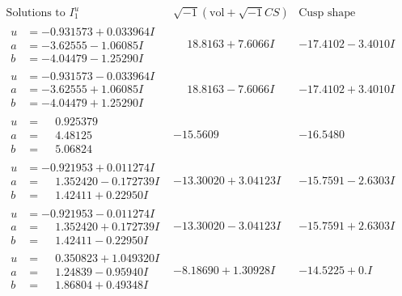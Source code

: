 \documentclass[1p]{elsarticle_modified}
\theoremstyle{definition}
\newcommand{\I}{\sqrt{-1}}
\begin{document}
$$\begin{array}{c|c|c}  
\text{Solutions to }I^u_{1}& \I (\text{vol} + \sqrt{-1}CS) & \text{Cusp shape}\\
 \hline 
\begin{aligned}
u &= -0.931573 + 0.033964 I \\
a &= -3.62555 - 1.06085 I \\
b &= -4.04479 - 1.25290 I\end{aligned}
 & \phantom{-}18.8163 + 7.6066 I & -17.4102 - 3.4010 I \\ \hline\begin{aligned}
u &= -0.931573 - 0.033964 I \\
a &= -3.62555 + 1.06085 I \\
b &= -4.04479 + 1.25290 I\end{aligned}
 & \phantom{-}18.8163 - 7.6066 I & -17.4102 + 3.4010 I \\ \hline\begin{aligned}
u &= \phantom{-}0.925379\phantom{ +0.000000I} \\
a &= \phantom{-}4.48125\phantom{ +0.000000I} \\
b &= \phantom{-}5.06824\phantom{ +0.000000I}\end{aligned}
 & -15.5609\phantom{ +0.000000I} & -16.5480\phantom{ +0.000000I} \\ \hline\begin{aligned}
u &= -0.921953 + 0.011274 I \\
a &= \phantom{-}1.352420 - 0.172739 I \\
b &= \phantom{-}1.42411 + 0.22950 I\end{aligned}
 & -13.30020 + 3.04123 I & -15.7591 - 2.6303 I \\ \hline\begin{aligned}
u &= -0.921953 - 0.011274 I \\
a &= \phantom{-}1.352420 + 0.172739 I \\
b &= \phantom{-}1.42411 - 0.22950 I\end{aligned}
 & -13.30020 - 3.04123 I & -15.7591 + 2.6303 I \\ \hline\begin{aligned}
u &= \phantom{-}0.350823 + 1.049320 I \\
a &= \phantom{-}1.24839 - 0.95940 I \\
b &= \phantom{-}1.86804 + 0.49348 I\end{aligned}
 & -8.18690 + 1.30928 I & -14.5225 + 0. I\phantom{ +0.000000I} \\ \hline\begin{aligned}

\end{aligned}
\end{array}$$
\end{document}
